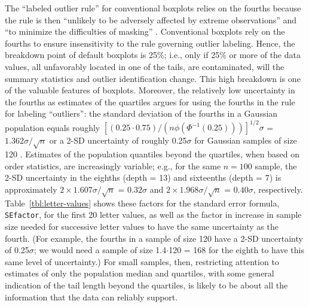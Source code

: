\documentclass[oneside]{article}
\begin{document}
The ``labeled outlier rule'' for conventional boxplots relies on the fourths because the rule is then ``unlikely to be adversely affected by extreme observations'' and ``to minimize the difficulties of masking'' \citep[pg. 992]{dchbox}. Conventional boxplots rely on the fourths to ensure insensitivity to the rule governing outlier labeling. Hence, the breakdown point of default boxplots is 25\%; i.e., only if 25\% or more of the data values, all unfavorably located in one of the tails, are contaminated, will the summary statistics and outlier identification change. This high breakdown is one of the valuable features of boxplots. Moreover, the relatively low uncertainty in the fourths as estimates of the quartiles argues for using the fourths in the rule for labeling ``outliers'': the standard deviation of the fourths in a Gaussian population equals roughly $[(0.25 \cdot 0.75) / (n \phi(\Phi^{-1}(0.25)))]^{1/2} \sigma$ = $1.362 \sigma / \sqrt{n}$ or a 2-SD uncertainty of roughly 0.25$\sigma$ for Gaussian samples of size 120 \citep{ha.order}. Estimates of the population quantiles beyond the quartiles, when based on order statistics, are increasingly variable; e.g., for the same $n = 100$ sample, the 2-SD uncertainty in the eighths (depth = 13) and sixteenths (depth = 7) is approximately $ 2 \times 1.607 \sigma / \sqrt{n}$ = $0.32 \sigma$ and $ 2 \times 1.968 \sigma / \sqrt{n}$ = $0.40 \sigma$, respectively. Table~\ref{tbl:letter-values} shows these factors for the standard error formula, \texttt{SEfactor}, for the first 20 letter values, as well as the factor in increase in sample size needed for successive letter values to have the same uncertainty as the fourth. (For example, the fourths in a sample of size 120 have a 2-SD uncertainty of 0.25$\sigma$; we would need a sample of size 1.4$\cdot$120 = 168 for the eighth to have this same level of uncertainty.) For small samples, then, restricting attention to estimates of only the population median and quartiles, with some general indication of the tail length beyond the quartiles, is likely to be about all the information that the data can reliably support.
\end{document}
